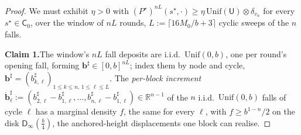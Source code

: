 \documentclass[11pt]{article}
\theoremstyle{definition}
\begin{document}
\begin{proof}
We must exhibit $\eta>0$ with $(P^{\star})^{nL}(s^{\star},\cdot) \geq \eta\,\mathrm{Unif}(\mathsf{U})\otimes\delta_{v_n}$ for every $s^{\star}\in\mathsf{C}_0$, over the window of $nL$ rounds, $L := \lceil 16M_0/b+3\rceil$ cyclic sweeps of the $n$ falls.

\smallskip\noindent\textbf{Claim 1.}\quad The window's $nL$ fall deposits are i.i.d.\ $\mathrm{Unif}(0,b)$, one per round's opening fall, forming $\mathbf{b}^{\sharp}\in[0,b]^{nL}$; index them by node and cycle, $\mathbf{b}^{\sharp}=(b^{\sharp}_{k,\ell})_{1\le k\le n,\,1\le\ell\le L}$. The \emph{per-block increment} $\mathring{\mathbf{b}}^{\sharp}_\ell := (b^{\sharp}_{2,\ell}-b^{\sharp}_{1,\ell},\ldots,b^{\sharp}_{n,\ell}-b^{\sharp}_{1,\ell})\in\mathbb{R}^{n-1}$ of the $n$ i.i.d.\ $\mathrm{Unif}(0,b)$ falls of cycle $\ell$ has a marginal density $f$, the same for every $\ell$, with $f \geq b^{1-n}/2$ on the disk $\mathsf{D}_\infty(\tfrac{b}{4})$, the anchored-height displacements one block can realise.


\end{proof}
\end{document}
